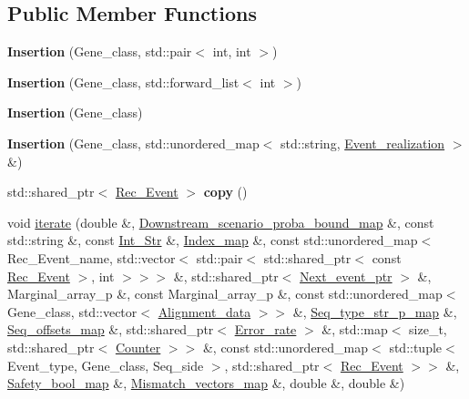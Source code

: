 \subsection*{Public Member Functions}
\begin{DoxyCompactItemize}
\item 
\mbox{\label{classInsertion_a0d34760832ea7f19cbac094a242d0e28}} 
{\bfseries Insertion} (Gene\+\_\+class, std\+::pair$<$ int, int $>$)
\item 
\mbox{\label{classInsertion_a0fac0c59a950d2b9a0f4665dea103b5f}} 
{\bfseries Insertion} (Gene\+\_\+class, std\+::forward\+\_\+list$<$ int $>$)
\item 
\mbox{\label{classInsertion_ad50ab30acaa070dafc9856804cee7191}} 
{\bfseries Insertion} (Gene\+\_\+class)
\item 
\mbox{\label{classInsertion_a21d1cf32f7cb2505ace6560499af6ff0}} 
{\bfseries Insertion} (Gene\+\_\+class, std\+::unordered\+\_\+map$<$ std\+::string, \hyperlink{structEvent__realization}{Event\+\_\+realization} $>$ \&)
\item 
\mbox{\label{classInsertion_a4d3b461170165250720e8a237c56be07}} 
std\+::shared\+\_\+ptr$<$ \hyperlink{classRec__Event}{Rec\+\_\+\+Event} $>$ {\bfseries copy} ()
\item 
void \hyperlink{classInsertion_a9c0f15989a298d7ddf7311c432f995b9}{iterate} (double \&, \hyperlink{classEnum__fast__memory__map}{Downstream\+\_\+scenario\+\_\+proba\+\_\+bound\+\_\+map} \&, const std\+::string \&, const \hyperlink{classInt__Str}{Int\+\_\+\+Str} \&, \hyperlink{classEnum__fast__memory__map}{Index\+\_\+map} \&, const std\+::unordered\+\_\+map$<$ Rec\+\_\+\+Event\+\_\+name, std\+::vector$<$ std\+::pair$<$ std\+::shared\+\_\+ptr$<$ const \hyperlink{classRec__Event}{Rec\+\_\+\+Event} $>$, int $>$$>$$>$ \&, std\+::shared\+\_\+ptr$<$ \hyperlink{classRec__Event}{Next\+\_\+event\+\_\+ptr} $>$ \&, Marginal\+\_\+array\+\_\+p \&, const Marginal\+\_\+array\+\_\+p \&, const std\+::unordered\+\_\+map$<$ Gene\+\_\+class, std\+::vector$<$ \hyperlink{structAlignment__data}{Alignment\+\_\+data} $>$$>$ \&, \hyperlink{classEnum__fast__memory__map}{Seq\+\_\+type\+\_\+str\+\_\+p\+\_\+map} \&, \hyperlink{classEnum__fast__memory__dual__key__map}{Seq\+\_\+offsets\+\_\+map} \&, std\+::shared\+\_\+ptr$<$ \hyperlink{classError__rate}{Error\+\_\+rate} $>$ \&, std\+::map$<$ size\+\_\+t, std\+::shared\+\_\+ptr$<$ \hyperlink{classCounter}{Counter} $>$$>$ \&, const std\+::unordered\+\_\+map$<$ std\+::tuple$<$ Event\+\_\+type, Gene\+\_\+class, Seq\+\_\+side $>$, std\+::shared\+\_\+ptr$<$ \hyperlink{classRec__Event}{Rec\+\_\+\+Event} $>$$>$ \&, \hyperlink{classEnum__fast__memory__map}{Safety\+\_\+bool\+\_\+map} \&, \hyperlink{classEnum__fast__memory__map}{Mismatch\+\_\+vectors\+\_\+map} \&, double \&, double \&)
$$
\end{DoxyCompactItemize}
